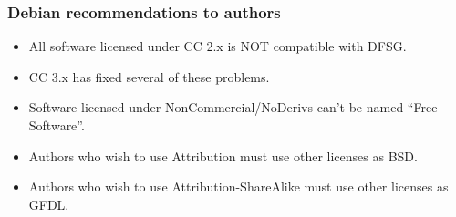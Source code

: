 

\begin{frame}
\frametitle{Debian recommendations to authors}

\begin{itemize}
\item All software licensed under CC 2.x is NOT compatible with DFSG. 
\item CC 3.x has fixed several of these problems.
\item Software licensed under NonCommercial/NoDerivs can't be named ``Free Software''.
\item Authors who wish to use Attribution must use other licenses as BSD.
\item Authors who wish to use Attribution-ShareAlike must use other licenses as GFDL.
\end{itemize}

\end{frame}











